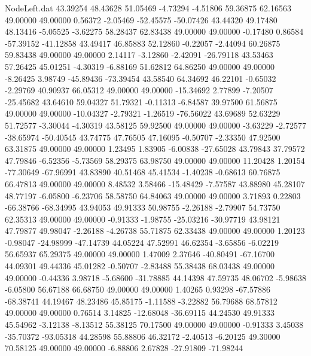 \begin{filecontents}{NodeLeft.dat}
  43.39254   48.43628   51.05469    -4.73294   -4.51806   59.36875   62.16563   49.00000   49.00000    0.56372   -2.05469  -52.45575  -50.07426
  43.44320   49.17480   48.13416    -5.05525   -3.62275   58.28437   62.83438   49.00000   49.00000   -0.17480    0.86584  -57.39152  -41.12858
  43.49417   46.85883   52.12860    -0.22057   -2.44094   60.26875   59.83438   49.00000   49.00000    2.14117   -3.12860   -2.42091  -26.79118
  43.53463   57.26425   45.01251    -4.30319   -6.88169   51.62812   64.86250   49.00000   49.00000   -8.26425    3.98749  -45.89436  -73.39454
  43.58540   64.34692   46.22101    -0.65032   -2.29769   40.90937   66.05312   49.00000   49.00000  -15.34692    2.77899   -7.20507  -25.45682
  43.64610   59.04327   51.79321    -0.11313   -6.84587   39.97500   61.56875   49.00000   49.00000  -10.04327   -2.79321   -1.26519  -76.56022
  43.69689   52.63229   51.72577    -3.30044   -4.30319   43.58125   59.92500   49.00000   49.00000   -3.63229   -2.72577  -38.65974  -50.40545
  43.74775   47.76505   47.16095    -0.50707   -2.33350   47.92500   63.31875   49.00000   49.00000    1.23495    1.83905   -6.00838  -27.65028
  43.79843   37.79572   47.79846    -6.52356   -5.73569   58.29375   63.98750   49.00000   49.00000   11.20428    1.20154  -77.30649  -67.96991
  43.83890   40.51468   45.41534    -1.40238   -0.68613   60.76875   66.47813   49.00000   49.00000    8.48532    3.58466  -15.48429   -7.57587
  43.88980   45.28107   48.77197    -6.05800   -6.23706   58.58750   64.84063   49.00000   49.00000    3.71893    0.22803  -66.38766  -68.34995
  43.94053   49.91333   50.98755    -2.26188   -2.79907   54.73750   62.35313   49.00000   49.00000   -0.91333   -1.98755  -25.03216  -30.97719
  43.98121   47.79877   49.98047    -2.26188   -4.26738   55.71875   62.33438   49.00000   49.00000    1.20123   -0.98047  -24.98999  -47.14739
  44.05224   47.52991   46.62354    -3.65856   -6.02219   56.65937   65.29375   49.00000   49.00000    1.47009    2.37646  -40.80491  -67.16700
  44.09301   49.44336   45.01282    -0.50707   -2.83488   55.38438   68.03438   49.00000   49.00000   -0.44336    3.98718   -5.68600  -31.78885
  44.14398   47.59735   48.06702    -5.98638   -6.05800   56.67188   66.68750   49.00000   49.00000    1.40265    0.93298  -67.57886  -68.38741
  44.19467   48.23486   45.85175    -1.11588   -3.22882   56.79688   68.57812   49.00000   49.00000    0.76514    3.14825  -12.68048  -36.69115
  44.24530   49.91333   45.54962    -3.12138   -8.13512   55.38125   70.17500   49.00000   49.00000   -0.91333    3.45038  -35.70372  -93.05318
  44.28598   55.88806   46.32172    -2.40513   -6.20125   49.30000   70.58125   49.00000   49.00000   -6.88806    2.67828  -27.91809  -71.98244

\end{filecontents}
